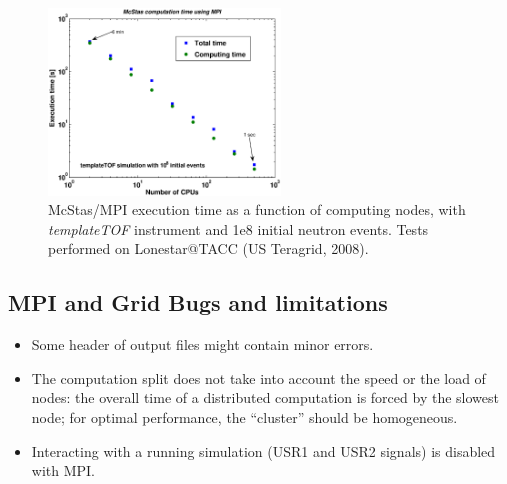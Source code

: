 \begin{figure}[htb!]
  \begin{center}
    \includegraphics[width=0.55\textwidth]{figures/mpi_efficiency.eps}
  \end{center}
\caption{McStas/MPI execution time as a function of computing nodes, with {\it templateTOF} instrument and 1e8 initial neutron events. Tests performed on Lonestar@TACC (US Teragrid, 2008).}
\label{fig:mpi_efficiency}
\end{figure}

\subsection{MPI and Grid Bugs and limitations}

\begin{itemize}
\item Some header of output files might contain minor errors.
\item The computation split does not take into account the speed or the
  load of nodes: the overall time of a distributed computation is
  forced by the slowest node; for optimal performance, the ``cluster''
  should be homogeneous.
\item Interacting with a running simulation (USR1 and USR2 signals) is disabled 
  with MPI.
\end{itemize}

